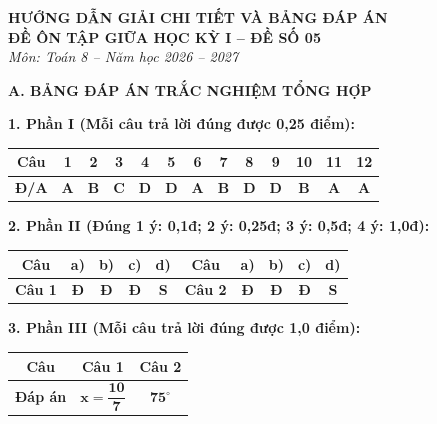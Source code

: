 \documentclass[12pt,a4paper]{article}
\begin{document}
\begin{center}
  \textbf{\Large HƯỚNG DẪN GIẢI CHI TIẾT VÀ BẢNG ĐÁP ÁN}\\
  \textbf{\large ĐỀ ÔN TẬP GIỮA HỌC KỲ I -- ĐỀ SỐ 05}\\
  \textit{Môn: Toán 8 -- Năm học 2026 -- 2027}
\end{center}
\vspace{2mm}

\noindent\textbf{\large A. BẢNG ĐÁP ÁN TRẮC NGHIỆM TỔNG HỢP}
\vspace{1mm}

\noindent\textbf{1. Phần I (Mỗi câu trả lời đúng được 0,25 điểm):}
\begin{center}
\begin{tabular}{|c|c|c|c|c|c|c|c|c|c|c|c|c|}
\hline
\textbf{Câu} & \textbf{1} & \textbf{2} & \textbf{3} & \textbf{4} & \textbf{5} & \textbf{6} & \textbf{7} & \textbf{8} & \textbf{9} & \textbf{10} & \textbf{11} & \textbf{12} \\
\hline
\textbf{Đ/A} & \textbf{A} & \textbf{B} & \textbf{C} & \textbf{D} & \textbf{D} & \textbf{A} & \textbf{B} & \textbf{D} & \textbf{D} & \textbf{B} & \textbf{A} & \textbf{A} \\
\hline
\end{tabular}
\end{center}
\vspace{0.5mm}

\noindent\textbf{2. Phần II (Đúng 1 ý: 0,1đ; 2 ý: 0,25đ; 3 ý: 0,5đ; 4 ý: 1,0đ):}
\begin{center}
\begin{tabular}{|c|c|c|c|c||c|c|c|c|c|}
\hline
\textbf{Câu} & \textbf{a)} & \textbf{b)} & \textbf{c)} & \textbf{d)} & \textbf{Câu} & \textbf{a)} & \textbf{b)} & \textbf{c)} & \textbf{d)} \\
\hline
\textbf{Câu 1} & \textbf{Đ} & \textbf{Đ} & \textbf{Đ} & \textbf{S} & \textbf{Câu 2} & \textbf{Đ} & \textbf{Đ} & \textbf{Đ} & \textbf{S} \\
\hline
\end{tabular}
\end{center}
\vspace{0.5mm}

\noindent\textbf{3. Phần III (Mỗi câu trả lời đúng được 1,0 điểm):}
\begin{center}
\begin{tabular}{|c|c|c|}
\hline
\textbf{Câu} & \textbf{Câu 1} & \textbf{Câu 2} \\
\hline
\textbf{Đáp án} & $\mathbf{x = \dfrac{10}{7}}$ & $\mathbf{75^\circ}$ \\
\hline
\end{tabular}
\end{center}
\vspace{1.5mm}
\end{document}
